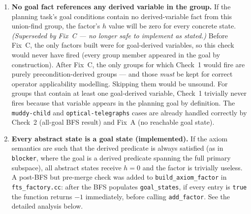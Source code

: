 \documentclass[11pt,a4paper]{article}
\begin{document}
\begin{enumerate}
\item \textbf{No goal fact references any derived variable in the group.}
  If the planning task's goal conditions contain no derived-variable fact from
  this union-find group, the factor's $h$ value will be zero for every concrete
  state.
  \emph{(Superseded by Fix~C --- no longer safe to implement as stated.)}
  Before Fix~C, the only factors built were for goal-derived variables, so this
  check would never have fired (every group member appeared in the goal by
  construction).  After Fix~C, the only groups for which Check~1 would fire are
  purely precondition-derived groups --- and those \emph{must} be kept for
  correct operator applicability modelling.  Skipping them would be unsound.
  For groups that contain at least one goal-derived variable, Check~1 trivially
  never fires because that variable appears in the planning goal by definition.
  The \texttt{muddy-child} and \texttt{optical-telegraphs} cases are already
  handled correctly by Check~2 (all-goal BFS result) and Fix~A
  (no reachable goal state).

\item \textbf{Every abstract state is a goal state (implemented).}
  If the axiom semantics are such that the derived predicate is always satisfied
  (as in \texttt{blocker}, where the goal is a derived predicate spanning the
  full primary subspace), all abstract states receive $h = 0$ and the factor is
  trivially useless.  A post-BFS but pre-merge check was added to
  \texttt{build\_axiom\_factor} in \texttt{fts\_factory.cc}: after the BFS
  populates \texttt{goal\_states}, if every entry is \texttt{true} the function
  returns $-1$ immediately, before calling \texttt{add\_factor}.  See the
  detailed analysis below.


\end{enumerate}
\end{document}

